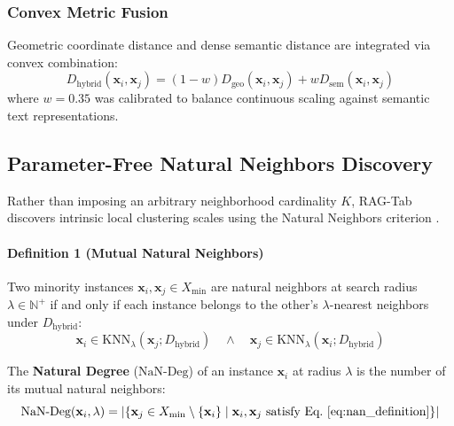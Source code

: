 \documentclass[sn-basic]{sn-jnl}
\begin{document}
\subsubsection{Convex Metric Fusion}
Geometric coordinate distance and dense semantic distance are integrated via convex combination:
\begin{equation}
\label{eq:hybrid_distance}
D_{\text{hybrid}}(\mathbf{x}_i, \mathbf{x}_j) = (1 - w) D_{\text{geo}}(\mathbf{x}_i, \mathbf{x}_j) + w D_{\text{sem}}(\mathbf{x}_i, \mathbf{x}_j)
\end{equation}
where $w = 0.35$ was calibrated to balance continuous scaling against semantic text representations.

\subsection{Parameter-Free Natural Neighbors Discovery}
\label{subsec:natural_neighbors}
Rather than imposing an arbitrary neighborhood cardinality $K$, RAG-Tab discovers intrinsic local clustering scales using the Natural Neighbors criterion \citep{huang2011natural}.

\paragraph{Definition 1 (Mutual Natural Neighbors)} Two minority instances $\mathbf{x}_i, \mathbf{x}_j \in X_{\min}$ are natural neighbors at search radius $\lambda \in \mathbb{N}^+$ if and only if each instance belongs to the other's $\lambda$-nearest neighbors under $D_{\text{hybrid}}$:
\begin{equation}
\label{eq:nan_definition}
\mathbf{x}_i \in \text{KNN}_\lambda(\mathbf{x}_j; D_{\text{hybrid}}) \quad \land \quad \mathbf{x}_j \in \text{KNN}_\lambda(\mathbf{x}_i; D_{\text{hybrid}})
\end{equation}

The \textbf{Natural Degree} ($\text{NaN-Deg}$) of an instance $\mathbf{x}_i$ at radius $\lambda$ is the number of its mutual natural neighbors:
\begin{equation}
\label{eq:nan_degree}
\text{NaN-Deg}(\mathbf{x}_i, \lambda) = \left| \left\{ \mathbf{x}_j \in X_{\min} \setminus \{\mathbf{x}_i\} \mid \mathbf{x}_i, \mathbf{x}_j \text{ satisfy Eq.~\eqref{eq:nan_definition}} \right\} \right|
\end{equation}
\end{document}
